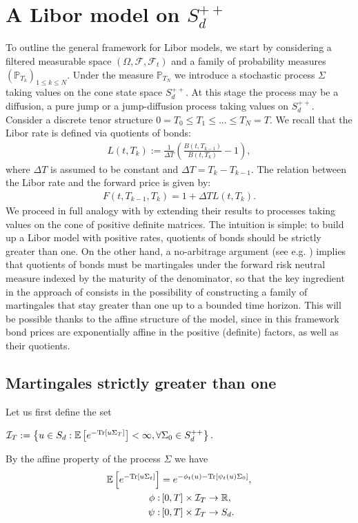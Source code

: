 
\section{A Libor model on $S_{d}^{++}$ }
To outline the general framework for Libor models, we start by considering a filtered measurable space $\left(\Omega,\mathcal{F},\mathcal{F}_t\right)$ and a family of probability measures $\left(\mathbb{P}_{T_k}\right)_{1\leq k\leq N}$. Under the measure $\mathbb{P}_{T_N}$ we introduce a stochastic process $\Sigma$ taking values on the cone state space $S_d^{++}$. At this stage the process may be a diffusion, a pure jump or a jump-diffusion process taking values on $S_d^{++}$.
Consider a discrete tenor structure $0=T_{0} \leq T_{1} \leq...\leq T_{N} =T$.  We recall that the Libor rate is defined via quotients of bonds:
\begin{align}
L(t, T_{k}):=\frac{1}{\Delta T}\left(\frac{B(t,T_{k-1})}{B(t,T_{k})}-1\right),
\end{align}
where $\Delta T$ is assumed to be constant and $\Delta T=T_{k}-T_{k-1}$. The relation between the Libor rate and the forward price is given by:
\begin{align}
F(t,T_{k-1},T_k)=1+\Delta T L(t, T_{k}).
\end{align}
We proceed in full analogy with \cite{article_KRPT2009} by extending their results to processes taking values on the cone of positive definite matrices. The intuition is simple: to build up a Libor model with positive rates, quotients of bonds should be strictly greater than one. On the other hand, a no-arbitrage argument (see e.g. \cite{Geman_1995}) implies that quotients of bonds must be martingales under the forward risk neutral measure indexed by the maturity of the denominator, so that the key ingredient in the approach of \cite{article_KRPT2009} consists in the possibility of constructing a family of martingales that stay greater than one up to a bounded time horizon. This will be possible thanks to the affine structure of the model, since in this framework bond prices are exponentially affine in the positive (definite) factors, as well as their quotients.\\


\subsection{Martingales strictly greater than one}


Let us first define the set
\begin{center}
$\mathcal{I}_{T}:=\left\{ u\in S_{d}:\mathbb{E}\left[ e^{-\textup{Tr}\left[u\Sigma_{T}\right]}\right]<\infty, \forall \Sigma_{0	} \in   S_{d}^{++}\right\}.$
\end{center}
 By the affine property of the process $\Sigma$ we have
\begin{align}
\mathbb{E}\left[ e^{-\textup{Tr}\left[u\Sigma_{t}\right]}\right]&=e^{-\phi_t(u)-\textup{Tr}\left[\psi_t(u)\Sigma_0\right]},\nonumber\\
\phi:&\left[0,T\right]\times\mathcal{I}_{T}\rightarrow \mathbb{R},\nonumber\\
\psi:&\left[0,T\right]\times\mathcal{I}_{T}\rightarrow S_d.
\end{align}

